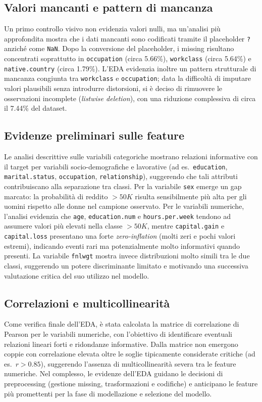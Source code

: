 \documentclass[a4paper,11pt]{article}
\begin{document}
\subsection{Valori mancanti e pattern di mancanza}
Un primo controllo visivo non evidenzia valori nulli, ma un’analisi più approfondita mostra che i dati mancanti sono codificati tramite il placeholder \texttt{?} anziché come \texttt{NaN}. 
Dopo la conversione del placeholder, i missing risultano concentrati soprattutto in \texttt{occupation} (circa 5.66\%), \texttt{workclass} (circa 5.64\%) e \texttt{native.country} (circa 1.79\%). 
L’EDA evidenzia inoltre un pattern strutturale di mancanza congiunta tra \texttt{workclass} e \texttt{occupation}; data la difficoltà di imputare valori plausibili senza introdurre distorsioni, si è deciso di rimuovere le osservazioni incomplete (\textit{listwise deletion}), con una riduzione complessiva di circa il 7.44\% del dataset. 

\subsection{Evidenze preliminari sulle feature}
Le analisi descrittive sulle variabili categoriche mostrano relazioni informative con il target per variabili socio-demografiche e lavorative (ad es.\ \texttt{education}, \texttt{marital.status}, \texttt{occupation}, \texttt{relationship}), suggerendo che tali attributi contribuiscano alla separazione tra classi. 
Per la variabile \texttt{sex} emerge un gap marcato: la probabilità di reddito \(>50K\) risulta sensibilmente più alta per gli uomini rispetto alle donne nel campione osservato. 
Per le variabili numeriche, l’analisi evidenzia che \texttt{age}, \texttt{education.num} e \texttt{hours.per.week} tendono ad assumere valori più elevati nella classe \(>50K\), mentre \texttt{capital.gain} e \texttt{capital.loss} presentano una forte \textit{zero-inflation} (molti zeri e pochi valori estremi), indicando eventi rari ma potenzialmente molto informativi quando presenti. 
La variabile \texttt{fnlwgt} mostra invece distribuzioni molto simili tra le due classi, suggerendo un potere discriminante limitato e motivando una successiva valutazione critica del suo utilizzo nel modello. 

\subsection{Correlazioni e multicollinearità}
Come verifica finale dell’EDA, è stata calcolata la matrice di correlazione di Pearson per le variabili numeriche, con l’obiettivo di identificare eventuali relazioni lineari forti e ridondanze informative. 
Dalla matrice non emergono coppie con correlazione elevata oltre le soglie tipicamente considerate critiche (ad es.\ \(r>0.85\)), suggerendo l’assenza di multicollinearità severa tra le feature numeriche. 
Nel complesso, le evidenze dell’EDA guidano le decisioni di preprocessing (gestione missing, trasformazioni e codifiche) e anticipano le feature più promettenti per la fase di modellazione e selezione del modello. 
\end{document}
